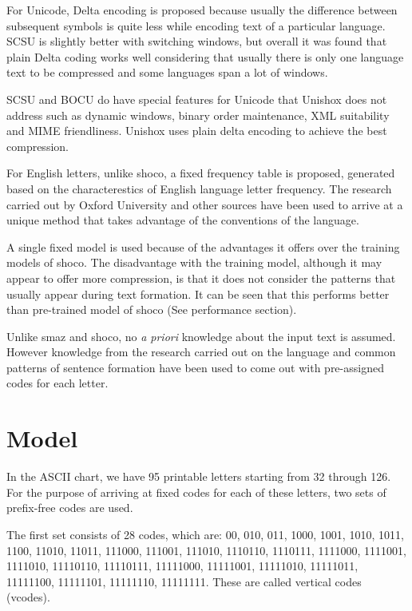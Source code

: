 \documentclass[]{article}
\begin{document}
For Unicode, Delta encoding is proposed because usually the difference between subsequent symbols is quite less while encoding text of a particular language. SCSU is slightly better with switching windows, but overall it was found that plain Delta coding works well considering that usually there is only one language text to be compressed and some languages span a lot of windows.

SCSU and BOCU do have special features for Unicode that Unishox does not address such as dynamic windows, binary order maintenance, XML suitability and MIME friendliness. Unishox uses plain delta encoding to achieve the best compression.

For English letters, unlike shoco, a fixed frequency table is proposed, generated based on the characterestics of English language letter frequency. The research carried out by Oxford University \cite{7} and other sources \cite{7} \cite{9} have been used to arrive at a unique method that takes advantage of the conventions of the language.

A single fixed model is used because of the advantages it offers over the training models of shoco. The disadvantage with the training model, although it may appear to offer more compression, is that it does not consider the patterns that usually appear during text formation. It can be seen that this performs better than pre-trained model of shoco (See performance section).

Unlike smaz and shoco, no \emph{a priori} knowledge about the input text is assumed. However knowledge from the research carried out on the language and common patterns of sentence formation have been used to come out with pre-assigned codes for each letter.

\section{Model}

In the ASCII chart, we have 95 printable letters starting from 32 through 126. For the purpose of arriving at fixed codes for each of these letters, two sets of prefix-free codes are used.

The first set consists of 28 codes, which are: 00, 010, 011, 1000, 1001, 1010, 1011, 1100, 11010, 11011, 111000, 111001, 111010, 1110110, 1110111, 1111000, 1111001, 1111010, 11110110, 11110111, 11111000, 11111001, 11111010, 11111011, 11111100, 11111101, 11111110, 11111111. These are called vertical codes (vcodes).
\end{document}
